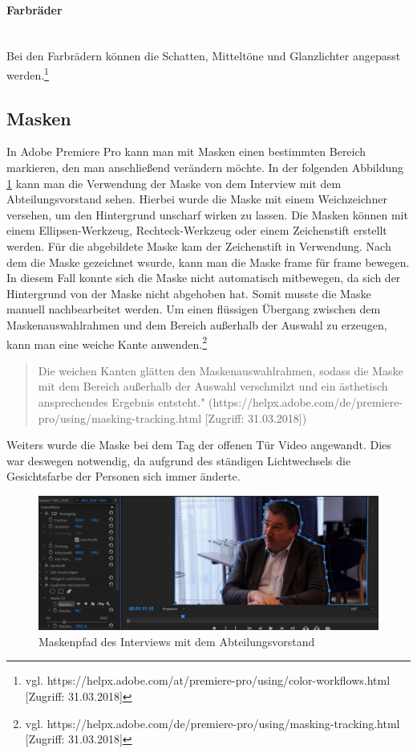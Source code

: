 \paragraph{Farbräder}
\leavevmode \\
Bei den Farbrädern können die Schatten, Mitteltöne und Glanzlichter angepasst werden.\footnote{vgl. https://helpx.adobe.com/at/premiere-pro/using/color-workflows.html [Zugriff: 31.03.2018]}
\subsection{Masken}
In Adobe Premiere Pro kann man mit Masken einen bestimmten Bereich markieren, den man anschließend verändern möchte. In der folgenden Abbildung \ref{fig:abb28} kann man die Verwendung der Maske von dem Interview mit dem Abteilungsvorstand sehen. 
Hierbei wurde die Maske mit einem Weichzeichner versehen, um den Hintergrund unscharf wirken zu lassen. Die Masken können mit einem Ellipsen-Werkzeug, Rechteck-Werkzeug oder einem Zeichenstift erstellt werden. Für die abgebildete Maske kam der Zeichenstift in Verwendung. Nach dem die Maske gezeichnet wsurde, kann man die Maske frame für frame bewegen. In diesem Fall konnte sich die Maske nicht automatisch mitbewegen, da sich der Hintergrund von der Maske nicht abgehoben hat. Somit musste die Maske manuell nachbearbeitet werden.\newline
Um einen flüssigen Übergang zwischen dem Maskenauswahlrahmen und dem Bereich außerhalb der Auswahl zu erzeugen, kann man eine weiche Kante anwenden.\footnote{vgl. https://helpx.adobe.com/de/premiere-pro/using/masking-tracking.html [Zugriff: 31.03.2018]}\begin{quote}Die weichen Kanten glätten den Maskenauswahlrahmen, sodass die Maske mit dem Bereich außerhalb der Auswahl verschmilzt und ein ästhetisch ansprechendes Ergebnis entsteht." (https://helpx.adobe.com/de/premiere-pro/using/masking-tracking.html [Zugriff: 31.03.2018])\end{quote}
Weiters wurde die Maske bei dem Tag der offenen Tür Video angewandt. Dies war deswegen notwendig, da aufgrund des ständigen Lichtwechsels die Gesichtsfarbe der Personen sich immer änderte. 
\begin{figure}[H]
	\centering
	\includegraphics[width=1.0\textwidth]{abb28} 
	\caption{Maskenpfad des Interviews mit dem Abteilungsvorstand}\label{fig:abb28}
\end{figure}
